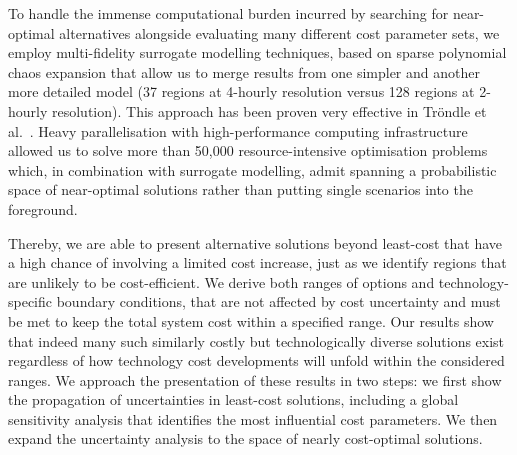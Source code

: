 
To handle the immense computational burden incurred by searching for
near-optimal alternatives alongside evaluating many different cost parameter
sets, we employ multi-fidelity surrogate modelling techniques, based on sparse
polynomial chaos expansion that allow us to merge results from one simpler and
another more detailed model (37 regions at 4-hourly resolution versus 128
regions at 2-hourly resolution). This approach has been proven very effective
in Tröndle et al.~\cite{trondle_trade-offs_2020}. Heavy parallelisation with
high-performance computing infrastructure allowed us to solve more than 50,000
resource-intensive optimisation problems which, in combination with surrogate
modelling, admit spanning a probabilistic space of near-optimal solutions rather
than putting single scenarios into the foreground.


Thereby, we are able to present alternative solutions beyond least-cost that
have a high chance of involving a limited cost increase, just as we identify
regions that are unlikely to be cost-efficient. We derive both ranges of options
and technology-specific boundary conditions, that are not affected by cost
uncertainty and must be met to keep the total system cost within a specified
range. Our results show that indeed many such similarly costly but
technologically diverse solutions exist regardless of how technology cost
developments will unfold within the considered ranges. We approach the
presentation of these results in two steps: we first show the propagation of
uncertainties in least-cost solutions, including a global sensitivity analysis
that identifies the most influential cost parameters. We then expand the
uncertainty analysis to the space of nearly cost-optimal solutions.





